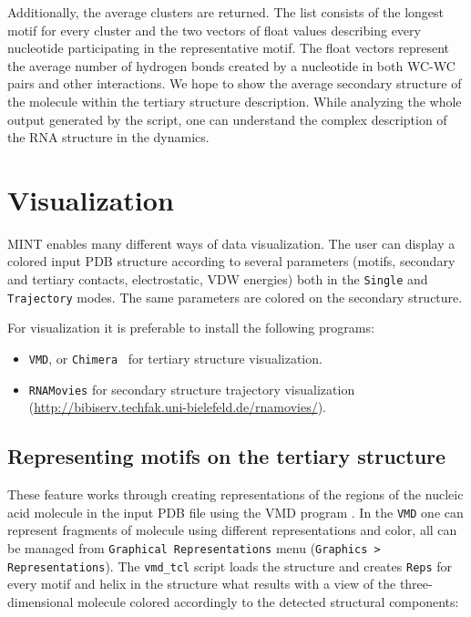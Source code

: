 \documentclass[12pt]{article}
\begin{document}
Additionally, the average clusters are returned. The list consists of the longest motif for every cluster and the two vectors of float values describing every nucleotide participating in the representative motif. The float vectors represent the average number of hydrogen bonds created by a nucleotide in both WC-WC pairs and other interactions. We hope to show the average secondary structure of the molecule within the tertiary structure description. While analyzing the whole output generated by the script, one can understand the complex description of the RNA structure in the dynamics.




\section{Visualization}\label{Visualization}
MINT enables many different ways of data visualization. The user can display a colored input PDB structure according to several parameters (motifs, secondary and tertiary contacts, electrostatic, VDW energies) both in the \texttt{Single} and \texttt{Trajectory} modes. The same parameters are colored on the secondary structure. 

For visualization it is preferable to install the following programs:
\begin{itemize}
\item {\tt VMD}\cite{Humphrey1996}, or {\tt Chimera}~\cite{Pettersen2004} for tertiary structure visualization.
\item {\tt RNAMovies} for secondary structure trajectory visualization (\url{http://bibiserv.techfak.uni-bielefeld.de/rnamovies/}).
\end{itemize}

\subsection{Representing motifs on the tertiary structure} 
\label{VMD}
These feature works through creating representations of the regions of the nucleic acid molecule in the input PDB file using the VMD program \cite{Humphrey1996}. In the \texttt{VMD} one can represent fragments of molecule using different representations and color, all can be managed from \texttt{Graphical Representations} menu (\texttt{Graphics > Representations}). The \texttt{vmd\_tcl} script loads the structure and creates \texttt{Reps} for every motif and helix in the structure what results with a view of the three-dimensional molecule colored accordingly to the detected structural components:
\end{document}
